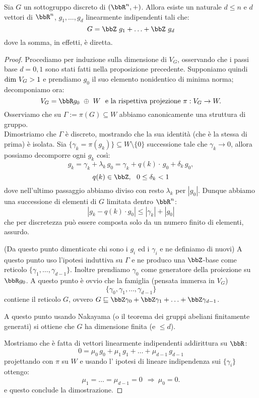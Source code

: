 \begin{teorema}Sia $G$ un sottogruppo discreto di $(\bbR^n,+)$. Allora esiste un naturale $d\leq n$ e $d$ vettori di $\bbR^n$, $g_1,\ldots,g_d$ linearmente indipendenti tali che:
$$
G=\bbZ\ g_1+\ldots+\bbZ\ g_d
$$
dove la somma, in effetti, è diretta.
\end{teorema}
\begin{proof}
Procediamo per induzione sulla dimensione di $V_G$, osservando che i passi base $d=0,1$ sono stati fatti nella proposizione precedente. Supponiamo quindi $\mbox{dim }{V_G}>1$ e prendiamo $g_0$ il suo elemento nonidentico di minima norma; decomponiamo ora:
$$
V_G=\bbR g_0\ \oplus\  W\ \mbox{ e la rispettiva projezione}\ \pi:V_G\rightarrow W.
$$
Osserviamo che su $\Gamma:=\pi(G)\subseteq W$ abbiamo canonicamente una struttura di gruppo.\\
Dimostriamo che $\Gamma$ è discreto, mostrando che la sua identità (che è la stessa di prima) è isolata. Sia $\{\gamma_k=\pi(g_k)\}\subseteq W\setminus\{0\}$ successione tale che $\gamma_k\rightarrow 0$, allora possiamo decomporre ogni $g_k$ così:
$$
g_k=\gamma_k+\lambda_k\, g_0=\gamma_k+q(k)\cdot\, g_0+\delta_k\, g_0,
$$
$$
q(k)\in\bbZ,\ \ 0\leq \delta_k<1
$$
dove nell'ultimo passaggio abbiamo diviso con resto $\lambda_k$ per $|g_0|$. Dunque abbiamo una successione di elementi di $G$ limitata dentro $\bbR^n$:
$$
|g_k-q(k)\cdot g_0| \leq |\gamma_k|+|g_0|
$$
che per discretezza può essere composta solo da un numero finito di elementi, assurdo.

(Da questo punto dimenticate chi sono i $g_i$ ed i $\gamma_i$ e ne definiamo di nuovi)
A questo punto uso l'ipotesi induttiva su $\Gamma$ e ne produco una $\bbZ$-base come reticolo $\{\gamma_1, \ldots, \gamma_{d-1}\}$.
Inoltre prendiamo $\gamma_0$ come generatore della proiezione su $\bbR g_0$.
A questo punto è ovvio che la famiglia (pensata immersa in $V_G$)
$$
\{\gamma_0,\gamma_1,\ldots,\gamma_{d-1}\}
$$
contiene il reticolo $G$, ovvero $G \sqsubseteq \bbZ \gamma_0 + \bbZ \gamma_1 + \ldots + \bbZ \gamma_{d-1}$.

A questo punto usando Nakayama (o il teorema dei gruppi abeliani finitamente generati) si ottiene che $G$ ha dimensione finita (e $\le d$).

Mostriamo che è fatta di vettori linearmente indipendenti addirittura su $\bbR$:
$$
0=\mu_0\, g_0+\mu_1\, g_1+\ldots+\mu_{d-1}\, g_{d-1}
$$
projettando con $\pi$ su $W$ e usando l' ipotesi di lineare indipendenza sui $\{\gamma_i\}$ ottengo:
$$
\mu_1=\ldots=\mu_{d-1}=0\ \ \Rightarrow\  \mu_0=0.
$$
e questo conclude la dimostrazione.
\end{proof}




